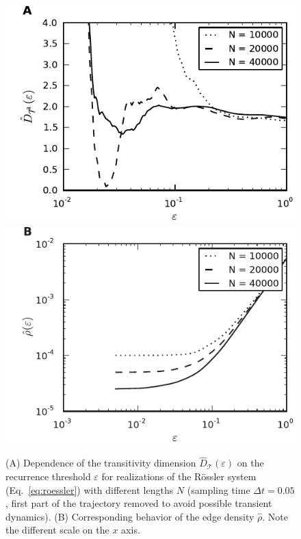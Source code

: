 \documentclass[graybox]{svmult}
\begin{document}
\begin{figure}
\centering
\includegraphics[width=.6\columnwidth]{transitivity3_dim_convergence.pdf} \\
\includegraphics[width=.6\columnwidth]{recurrence_rates.pdf} \\
\caption{(A) Dependence of the transitivity dimension $\hat{D}_{\mathcal{T}}(\varepsilon)$ on the recurrence threshold $\varepsilon$ for realizations of the R\"ossler system (Eq.~\ref{eq:roessler}) with different lengths $N$ (sampling time $\Delta t=0.05$, first part of the trajectory removed to avoid possible transient dynamics). (B) Corresponding behavior of the edge density $\hat{\rho}$. Note the different scale on the $x$ axis.}
\label{fig:roessler_transitivity}
\end{figure}
\end{document}
